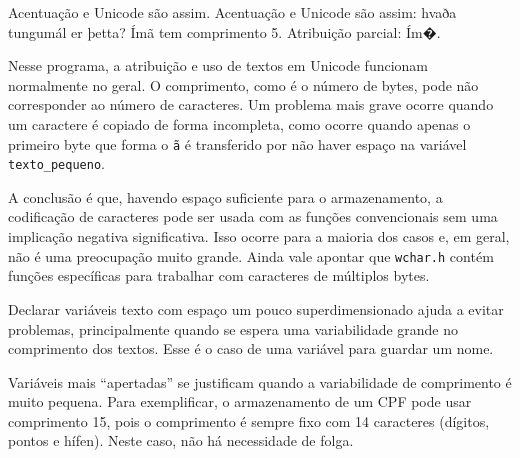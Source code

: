 \documentclass[
  11pt,
  a4paper,
]{scrbook}
\newenvironment{Shaded}{\begin{snugshade}}{\end{snugshade}}
\newcommand{\NormalTok}[1]{#1}
\begin{document}
\begin{Shaded}
\begin{Highlighting}[]
\NormalTok{Acentuação e Unicode são assim.}
\NormalTok{Acentuação e Unicode são assim: hvaða tungumál er þetta?}
\NormalTok{\textquotesingle{}Ímã\textquotesingle{} tem comprimento 5.}
\NormalTok{Atribuição parcial: \textquotesingle{}Ím�\textquotesingle{}.}
\end{Highlighting}
\end{Shaded}

Nesse programa, a atribuição e uso de textos em Unicode funcionam
normalmente no geral. O comprimento, como é o número de bytes, pode não
corresponder ao número de caracteres. Um problema mais grave ocorre
quando um caractere é copiado de forma incompleta, como ocorre quando
apenas o primeiro byte que forma o \texttt{ã} é transferido por não
haver espaço na variável \texttt{texto\_pequeno}.

A conclusão é que, havendo espaço suficiente para o armazenamento, a
codificação de caracteres pode ser usada com as funções convencionais
sem uma implicação negativa significativa. Isso ocorre para a maioria
dos casos e, em geral, não é uma preocupação muito grande. Ainda vale
apontar que \texttt{wchar.h} contém funções específicas para trabalhar
com caracteres de múltiplos bytes.

\begin{tcolorbox}[enhanced jigsaw, arc=.35mm, bottomtitle=1mm, colbacktitle=quarto-callout-tip-color!10!white, title=\textcolor{quarto-callout-tip-color}{\faLightbulb}\hspace{0.5em}{Dica}, toprule=.15mm, left=2mm, opacityback=0, colback=white, colframe=quarto-callout-tip-color-frame, opacitybacktitle=0.6, bottomrule=.15mm, leftrule=.75mm, toptitle=1mm, coltitle=black, titlerule=0mm, rightrule=.15mm, breakable]

Declarar variáveis texto com espaço um pouco superdimensionado ajuda a
evitar problemas, principalmente quando se espera uma variabilidade
grande no comprimento dos textos. Esse é o caso de uma variável para
guardar um nome.

Variáveis mais ``apertadas'' se justificam quando a variabilidade de
comprimento é muito pequena. Para exemplificar, o armazenamento de um
CPF pode usar comprimento 15, pois o comprimento é sempre fixo com 14
caracteres (dígitos, pontos e hífen). Neste caso, não há necessidade de
folga.

\end{tcolorbox}
\end{document}
